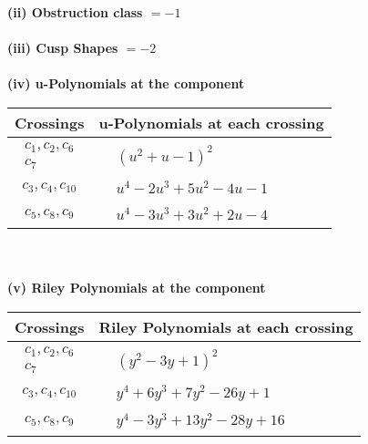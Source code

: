 \documentclass[1p]{elsarticle_modified}
\theoremstyle{definition}
\begin{document}
\flushleft \textbf{(ii) Obstruction class $= -1$}\\~\\
\flushleft \textbf{(iii) Cusp Shapes $= -2$}\\~\\
\newpage\renewcommand{\arraystretch}{1}
\flushleft \textbf{(iv) u-Polynomials at the component}\newline \\
\begin{tabular}{m{50pt}|m{274pt}}
Crossings & \hspace{64pt}u-Polynomials at each crossing \\
\hline $$\begin{aligned}c_{1},c_{2},c_{6}\\c_{7}\end{aligned}$$&$\begin{aligned}
&(u^2+u-1)^2
\end{aligned}$\\
\hline $$\begin{aligned}c_{3},c_{4},c_{10}\end{aligned}$$&$\begin{aligned}
&u^4-2 u^3+5 u^2-4 u-1
\end{aligned}$\\
\hline $$\begin{aligned}c_{5},c_{8},c_{9}\end{aligned}$$&$\begin{aligned}
&u^4-3 u^3+3 u^2+2 u-4
\end{aligned}$\\
\hline
\end{tabular}\\~\\
\newpage\renewcommand{\arraystretch}{1}
\flushleft \textbf{(v) Riley Polynomials at the component}\newline \\
\begin{tabular}{m{50pt}|m{274pt}}
Crossings & \hspace{64pt}Riley Polynomials at each crossing \\
\hline $$\begin{aligned}c_{1},c_{2},c_{6}\\c_{7}\end{aligned}$$&$\begin{aligned}
&(y^2-3 y+1)^2
\end{aligned}$\\
\hline $$\begin{aligned}c_{3},c_{4},c_{10}\end{aligned}$$&$\begin{aligned}
&y^4+6 y^3+7 y^2-26 y+1
\end{aligned}$\\
\hline $$\begin{aligned}c_{5},c_{8},c_{9}\end{aligned}$$&$\begin{aligned}
&y^4-3 y^3+13 y^2-28 y+16
\end{aligned}$\\
\hline
\end{tabular}\\~\\
\end{document}
